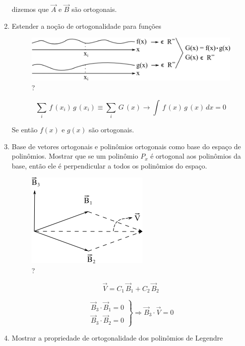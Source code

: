 \begin{enumerate}
dizemos que $\vec A$ e $\vec B$ são ortogonais.

\item
Estender a noção de ortogonalidade para funções

\begin{figure}[htb]
 \centering
 \includegraphics[scale=1.0]{capitulos/capitulo2/figuras/roteiro_da_aula3.png}
 \caption{?}
 \label{fig:roteiro_da_aula3}
\end{figure}

\[
 \sum_i \, f\,(x_i) \, g\,(x_i) \equiv \sum_i \, G\,(x) \rightarrow \int \, f\,(x) \, g\,(x) \, dx = 0
\]

Se  então $f(x)$ e $g(x)$ são ortogonais.

\item
Base de vetores ortogonais e polinômios ortogonais como base do espaço de polinômios. Mostrar que se um polinômio $P_{x}$ é ortogonal aos polinômios da base, então ele é perpendicular a todos os polinômios do espaço.

\begin{figure}[htb]
 \centering
 \includegraphics[scale=0.8]{capitulos/capitulo2/figuras/roteiro_da_aula4.png}
 \caption{?}
 \label{fig:roteiro_da_aula4}
\end{figure}

\[
 \vec V = C_1 \, \vec B_1 + C_2 \, \vec B_2
\]

\[
 \left.
 \begin{array}{l}
  \vec B_3 \cdot \vec B_1 = 0 \\
  \vec B_3 \cdot \vec B_2 = 0
 \end{array}
 \right\}
 \Rightarrow
 \vec B_3 \cdot \vec V = 0
\]

\item
Mostrar a propriedade de ortogonalidade dos polinômios de Legendre


\end{enumerate}
